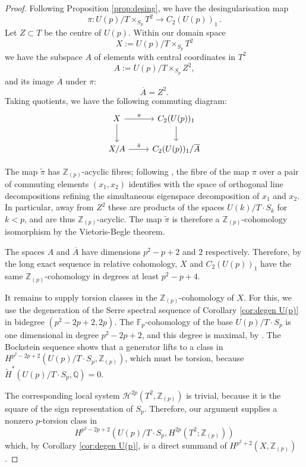 \documentclass[oneside, 12pt, a4paper]{amsart}
\numberwithin{equation}{section}
\newcommand{\F}{\mathbb{F}}
\newcommand{\Z}{\mathbb{Z}}
\theoremstyle{plain}
\theoremstyle{definition}
\theoremstyle{remark}
\begin{document}
\begin{proof}
  Following Proposition \ref{prop:desing}, we have the desingularisation map \[\pi:U(p)/T\times_{S_p} T^2\to C_2(U(p))_1\, .\]
 Let $Z\subset T$ be the centre of $U(p)$. Within our domain space \[X:=U(p)/T\times_{S_p} T^2\] we have the subspace $A$ of elements with central coordinates in $T^2$\[A:=U(p)/T\times_{S_p} Z^2,\] and its image $\overline{A}$ under $\pi$: \[\overline{A}=Z^2.\]
 Taking quotients, we have the following commuting diagram:\[\begin{tikzcd}
 X\arrow[r,"\pi"]\arrow[d]&C_2(U(p))_1\arrow[d]\\
 X/A\arrow[r,"\tilde{\pi}"]&C_2(U(p))_1/\overline{A}
 \end{tikzcd}\]

 The map $\tilde{\pi}$ has $\Z_{(p)}$-acyclic fibres; following \cite{Baird}, the fibre of the map ${\pi}$ over a pair of commuting elements $(x_1,x_2)$ identifies with the space of orthogonal line decompositions refining the simultaneous eigenspace decomposition of $x_1$ and $x_2$. In particular, away from $Z^2$ these are products of the spaces $U(k)/T\cdot S_k$ for $k<p$, and are thus $\mathbb{Z}_{(p)}$-acyclic. The map $\tilde{\pi}$ is therefore a $\Z_{(p)}$-cohomology isomorphism by the Vietoris-Begle theorem.
 
 The spaces $A$ and $\overline{A}$ have dimensions $p^2-p+2$ and $2$ respectively. Therefore, by the long exact sequence in relative cohomology, $X$ and $C_2(U(p))_1$ have the same $\mathbb{Z}_{(p)}$-cohomology in degrees at least $p^2-p+4$.
 
 It remains to supply torsion classes in the $\mathbb{Z}_{(p)}$-cohomology of $X$. For this, we use the degeneration of the Serre spectral sequence of Corollary \ref{cor:degen U(p)} in bidegree $(p^2-2p+2,2p)$. The $\F_p$-cohomology of the base $U(p)/T\cdot S_p$ is one dimensional in degree $p^2-2p+2$, and this degree is maximal, by \cite[Corollary 6.9]{GuerraJanna}. The Bockstein sequence shows that a generator lifts to a class in $H^{p^2-2p+2}(U(p)/T\cdot S_p,\Z_{(p)})$, which must be torsion, because $\tilde{H}^{*}(U(p)/T\cdot S_p,\mathbb{Q})=0$.
 
 The corresponding local system $\mathcal{H}^{2p}(T^2,\Z_{(p)})$ is trivial, because it is the square of the sign representation of $S_p$.  Therefore, our argument supplies a nonzero $p$-torsion class in \[H^{p^2-2p+2}(U(p)/T\cdot S_p,H^{2p}(T^2;\Z_{(p)}))\] 
 which, by Corollary \ref{cor:degen U(p)}, is a direct summand of $H^{p^2+2}(X,\Z_{(p)})$.
\end{proof}
\end{document}
